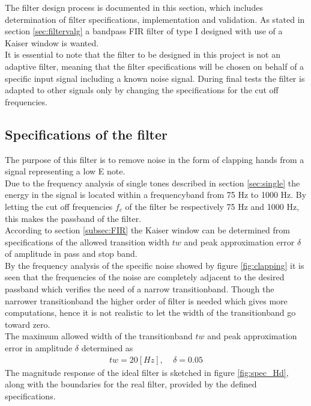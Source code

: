 The filter design process is documented in this section, which includes determination of filter specifications, implementation and validation. As stated in section \ref{sec:filtervalg} a bandpass FIR filter of type I designed with use of a Kaiser window is wanted.\\
It is essential to note that the filter to be designed in this project is not an adaptive filter, meaning that the filter specifications will be chosen on behalf of a specific  input signal including a known noise signal. During final tests the filter is adapted to other signals only by changing the specifications for the cut off frequencies.

\subsection{Specifications of the filter} \label{sec:FIRspec} 
The purpose of this filter is to remove noise in the form of clapping hands from a signal representing a low E note. \\
Due to the frequency analysis of single tones described in section \ref{sec:single} the energy in the signal is located within a frequencyband from 75 Hz to 1000 Hz.  
By letting the cut off frequencies $f_c$ of the filter be respectively 75 Hz and 1000 Hz, this makes the passband of the filter.\\ 
According to section \ref{subsec:FIR} the Kaiser window can be determined from specifications of the allowed transition width $tw$ and peak approximation error $\delta$ of amplitude in pass and stop band.\\ 
By the frequency analysis of the specific noise showed by figure \ref{fig:clapping} it is seen that the frequencies of the noise are completely adjacent to the desired passband which verifies the need of a narrow transitionband. Though the narrower transitionband the higher order of filter is needed which gives more computations, hence it is not realistic to let the width of the transitionband go toward zero.  \\  
The maximum allowed width of the transitionband $tw$ and peak approximation error in amplitude $\delta$ determined as
\begin{align}
tw = 20 [Hz], \ \ \ \ \  \delta = 0.05 
\end{align}
The magnitude response of the ideal filter is sketched in figure \ref{fig:spec_Hd}, along with the boundaries for the real filter, provided by the defined specifications.      

